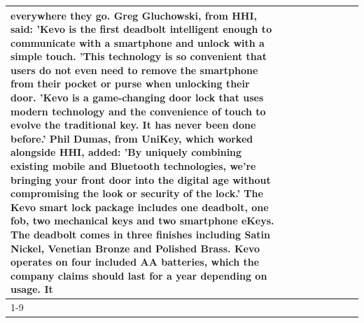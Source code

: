 \begin{table}[H]
\begin{tabular}{lllrlllll}
everywhere they go. Greg Gluchowski, from HHI, said: 'Kevo is the first deadbolt intelligent enough to communicate with a smartphone and unlock with a simple touch. 'This technology is so convenient that users do not even need to remove the smartphone from their pocket or purse when unlocking their door. 'Kevo is a game-changing door lock that uses modern technology and the convenience of touch to evolve the traditional key. It has never been done before.' Phil Dumas, from UniKey, which worked alongside HHI, added: 'By uniquely combining existing mobile and Bluetooth technologies, we’re bringing your front door into the digital age without compromising the look or security of the lock.' The Kevo smart lock package includes one deadbolt, one fob, two mechanical keys and two smartphone eKeys. The deadbolt comes in three finishes including Satin Nickel, Venetian Bronze and Polished Brass. Kevo operates on four included AA batteries, which the company claims should last for a year depending on usage. It \\
\cline{1-9}

\end{tabular}
\end{table}
